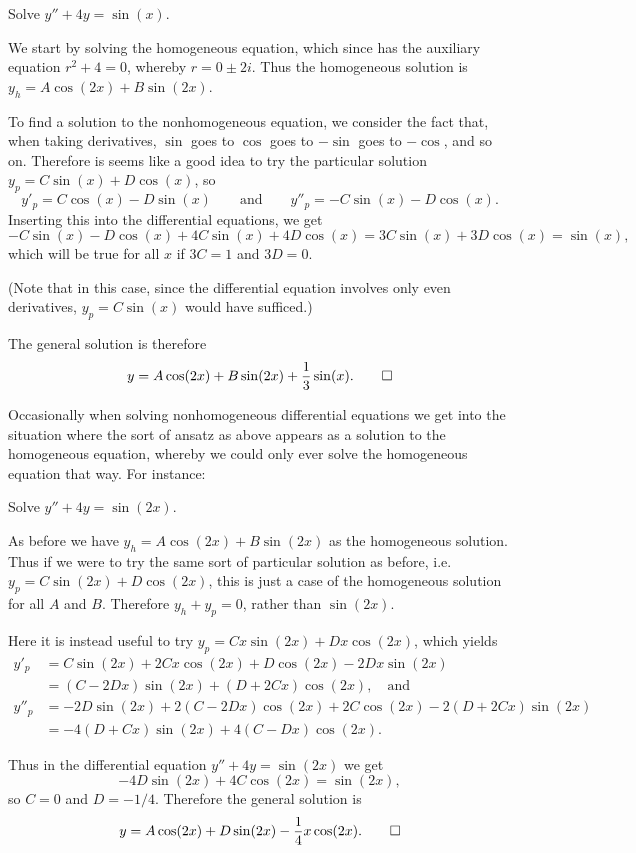 \begin{example}
	Solve $y'' + 4 y = \sin(x)$.

	We start by solving the homogeneous equation, which since has the auxiliary equation $r^2 + 4 = 0$, whereby $r = 0 \pm 2 i$.
	Thus the homogeneous solution is $y_h = A \cos(2 x) + B \sin(2 x)$.

	To find a solution to the nonhomogeneous equation, we consider the fact that, when taking derivatives, $\sin$ goes to $\cos$ goes to $-\sin$ goes to $-\cos$, and so on.
	Therefore is seems like a good idea to try the particular solution $y_p = C \sin(x) + D \cos(x)$, so
	\[
		y'_p = C \cos(x) - D \sin(x) \qquad \text{and} \qquad y''_p = - C \sin(x) - D \cos(x).
	\]
	Inserting this into the differential equations, we get
	\[
	- C \sin(x) - D \cos(x) + 4 C \sin(x) + 4 D \cos(x) = 3 C \sin(x) + 3 D \cos(x) = \sin(x),
	\]
	which will be true for all $x$ if $3 C = 1$ and $3 D = 0$.

	(Note that in this case, since the differential equation involves only even derivatives, $y_p = C \sin(x)$ would have sufficed.)

	The general solution is therefore
	\[
		y = A \cos(2 x) + B \sin(2 x) + \frac{1}{3} \sin(x). \qedhere
	\]
\end{example}

\noindent
Occasionally when solving nonhomogeneous differential equations we get into the situation where the sort of ansatz as above appears as a solution to the homogeneous equation, whereby we could only ever solve the homogeneous equation that way. For instance:

\begin{example}
	Solve $y'' + 4 y = \sin(2 x)$.

	As before we have $y_h = A \cos(2 x) + B \sin(2 x)$ as the homogeneous solution.
	Thus if we were to try the same sort of particular solution as before, i.e. $y_p = C \sin(2 x) + D \cos(2 x)$, this is just a case of the homogeneous solution for all $A$ and $B$.
	Therefore $y_h + y_p = 0$, rather than $\sin(2 x)$.

	Here it is instead useful to try $y_p = C x \sin(2 x) + D x \cos(2 x)$, which yields
	\begin{align*}
		y'_p  &= C \sin(2 x) + 2 C x \cos(2 x) + D \cos(2 x) - 2 D x \sin(2 x) \\
		      &= (C - 2 D x) \sin(2 x) + (D + 2 C x) \cos(2 x), \quad \text{and} \\
		y''_p &= -2 D \sin(2 x) + 2 (C - 2 D x) \cos(2 x) + 2 C \cos(2 x) - 2 (D + 2 C x) \sin(2 x) \\
		      &= -4 (D + C x) \sin(2 x) + 4 (C - D x) \cos(2 x).
	\end{align*}

	\noindent
	Thus in the differential equation $y'' + 4 y = \sin(2 x)$ we get
	\[
		-4 D \sin(2 x) + 4 C \cos(2 x) = \sin(2 x),
	\]
	so $C = 0$ and $D = - 1 / 4$. Therefore the general solution is
	\[
		y = A \cos(2 x) + D \sin(2 x) - \frac{1}{4} x \cos(2 x). \qedhere
	\]
\end{example}

